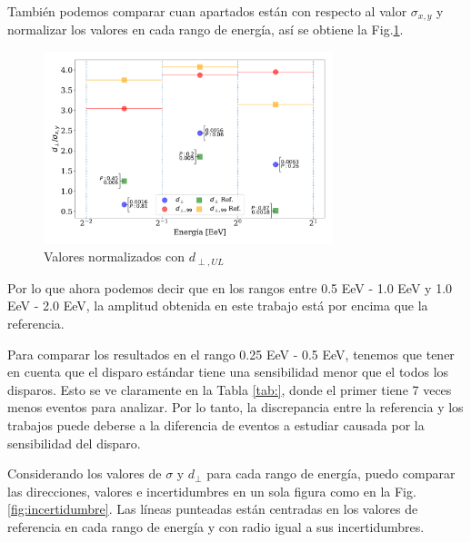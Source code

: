 \documentclass[11pt,papel,oneside,singlespace]{ibtesis}
\begin{document}
    También podemos comparar cuan apartados están con respecto al valor $\sigma_{x,y}$ y normalizar los valores en cada rango de energía, así se obtiene la Fig.\ref{fig:normalizado_sigma}.

    \begin{figure}[H]
        \begin{small}
            \begin{center}
                \includegraphics[width=0.75\textwidth]{d_perp_normalizado_sigmas_v4.pdf}
            \end{center}
            \caption{Valores normalizados con $d_{\perp,UL}$}
            \label{fig:normalizado_sigma}
        \end{small}
    \end{figure}

Por lo que ahora podemos decir que en los rangos entre 0.5 EeV - 1.0 EeV y 1.0 EeV - 2.0 EeV, la amplitud obtenida en este trabajo está por encima que la referencia. 

Para comparar los resultados en el  rango 0.25 EeV - 0.5 EeV, tenemos que tener en cuenta que el disparo estándar tiene una sensibilidad menor que el todos los disparos. Esto se ve claramente en la Tabla \ref{tab:}, donde el primer tiene 7 veces menos eventos para analizar. Por lo tanto, la discrepancia entre la referencia y los trabajos puede deberse a la  diferencia de eventos a estudiar causada por la sensibilidad del disparo.


Considerando los valores de $\sigma$ y $d_\perp$ para cada rango de energía, puedo comparar las direcciones, valores e incertidumbres en un sola figura como en la Fig.\ref{fig:incertidumbre}. Las líneas punteadas están centradas en los valores de referencia en cada rango de energía y con radio igual a sus incertidumbres. 
\end{document}
